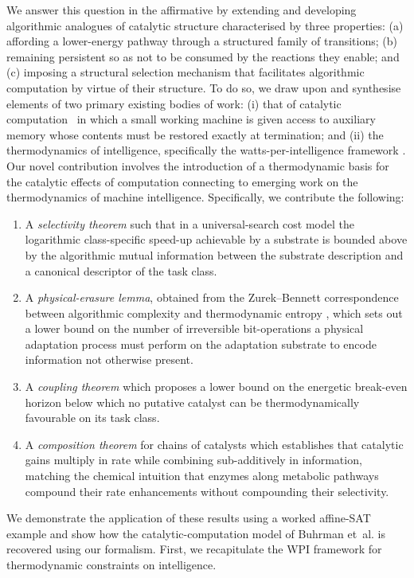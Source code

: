 \documentclass[runningheads]{llncs}
\begin{document}
We answer this question in the affirmative by extending and developing algorithmic analogues of catalytic structure characterised by three properties: (a) affording a lower-energy pathway through a structured family of transitions; (b) remaining persistent so as not to be consumed by the reactions they enable; and (c) imposing a structural selection mechanism that facilitates algorithmic computation by virtue of their structure. To do so, we draw upon and synthesise elements of two primary existing bodies of work: (i) that of catalytic computation~\cite{buhrman2014computing} in which a small working machine is given access
to auxiliary memory whose contents must be restored exactly at
termination; and (ii) the thermodynamics of intelligence, specifically the watts-per-intelligence framework \cite{perrier2025watts}. Our novel contribution involves the introduction of a thermodynamic basis for the catalytic effects of computation connecting to emerging work on the thermodynamics of machine intelligence. Specifically, we contribute the following: 
\begin{enumerate}
    \item A \emph{selectivity theorem} such that in a
universal-search cost model the logarithmic class-specific speed-up
achievable by a substrate is bounded above by the algorithmic mutual
information between the substrate description and a canonical
descriptor of the task class.
\item A \emph{physical-erasure lemma},
obtained from the Zurek--Bennett correspondence between algorithmic
complexity and thermodynamic
entropy \cite{zurek1989algorithmic,bennett1982thermodynamics},
which sets out a lower bound on the
number of irreversible bit-operations a physical adaptation
process must perform on the adaptation substrate to encode information not otherwise present.
\item A \emph{coupling theorem} which proposes a lower bound on the energetic break-even horizon below which no
putative catalyst can be thermodynamically favourable on its task class.
\item A \emph{composition theorem}
for chains of catalysts which establishes that catalytic gains multiply in
rate while combining sub-additively in information, matching the
chemical intuition that enzymes along metabolic pathways compound
their rate enhancements without compounding their selectivity.
\end{enumerate}
   We demonstrate the application of these results using a worked affine-SAT example and show how the catalytic-computation model of Buhrman et~al. \cite{buhrman2014computing} is recovered using our formalism. First, we recapitulate the WPI framework for thermodynamic constraints on intelligence.
\end{document}

